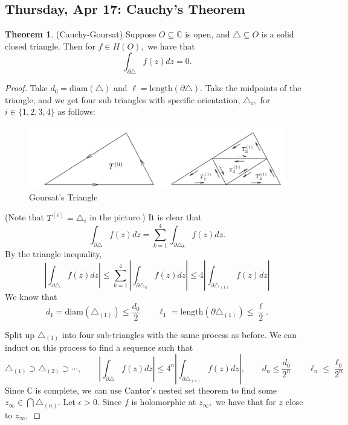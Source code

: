 \documentclass[10pt, oneside]{article}
\newcommand{\bbC}{\mathbb{C}}
\theoremstyle{definition}
\newtheorem{thm}{Theorem}
\begin{document}
\subsection{Thursday, Apr 17: Cauchy's Theorem}
\begin{thm}
    (Cauchy-Goursat) Suppose $O\subseteq \bbC$ is open, and $\triangle \subseteq O$ is a solid closed triangle. Then for $f\in H(O),$ we have that 
    \[\int_{\partial \triangle} f(z)dz = 0.\]
\end{thm}
\begin{proof}
Take $d_0= \text{diam}(\triangle)$ and $\ell = \text{length}(\partial \triangle).$
 Take the midpoints of the triangle, and we get four sub triangles with specific orientation, $\triangle_i,$ for $i\in \{1,2,3,4\}$ as follows: 
    \begin{figure}[H]
        \centering
        \includegraphics[width=0.5\linewidth]{Images/Goursat.png}
        \caption{Goursat's Triangle}
    \end{figure}
    (Note that $T^{(i)} = \triangle_i$ in the picture.) It is clear that 
    \[\int_{\partial \triangle} f(z)dz = \sum_{k=1}^4 \int_{\partial \triangle_k}f(z)dz.\] By the triangle inequality, 
    \[\left|\int_{\partial \triangle}f(z)dz\right| \leq \sum_{k=1}^4 \left|\int_{\partial \triangle_k}f(z)dz\right| \leq 4 \left|\int_{\partial \triangle_{(1)}}f(z)dz\right|\] We know that 
    \[d_1 = \text{diam}(\triangle_{(1)}) \leq \frac{d_0}{2} \qquad \ell_1 = \text{length}(\partial \triangle_{(1)}) \leq \frac{\ell}{2}.\]
    
    Split up $\triangle_{(1)}$ into four sub-triangles with the same process as before. We can induct on this process to find a sequence such that
    \[\triangle_{(1)}\supset \triangle_{(2)}\supset \cdots , \qquad \left|\int_{\partial \triangle}f(z)dz\right|  \leq 4^n \left|\int_{\partial \triangle_{(n)}}f(z)dz\right|, \qquad d_n \leq \frac{d_0}{2^n} \qquad \ell_n \leq \frac{\ell_0}{2^n}\] Since $\bbC$ is complete, we can use Cantor's nested set theorem to find some $z_\infty \in \bigcap \triangle_{(n)}.$ Let $\epsilon>0.$ Since $f$ is holomorphic at $z_\infty,$ we have that for $z$ close to $z_\infty,$ 
    

\end{proof}
\end{document}
